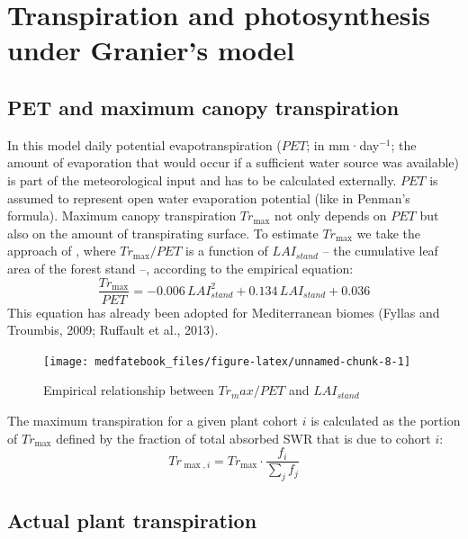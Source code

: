 \documentclass[]{book}
\begin{document}
\hypertarget{transpirationgranier}{%
\chapter{Transpiration and photosynthesis under Granier's model}\label{transpirationgranier}}

\hypertarget{pet-and-maximum-canopy-transpiration}{%
\section{PET and maximum canopy transpiration}\label{pet-and-maximum-canopy-transpiration}}

In this model daily potential evapotranspiration (\(PET\); in mm·day\(^{-1}\); the amount of evaporation that would occur if a sufficient water source was available) is part of the meteorological input and has to be calculated externally. \(PET\) is assumed to represent open water evaporation potential (like in Penman's formula). Maximum canopy transpiration \(Tr_{\max}\) not only depends on \(PET\) but also on the amount of transpirating surface. To estimate \(Tr_{\max}\) we take the approach of \citet{Granier1999}, where \(Tr_{\max}/PET\) is a function of \(LAI_{stand}\) -- the cumulative leaf area of the forest stand --, according to the empirical equation:
\begin{equation}
\frac{Tr_{\max}}{PET}= -0.006\,LAI_{stand}^2+0.134\,LAI_{stand}+0.036
\end{equation}
This equation has already been adopted for Mediterranean biomes (Fyllas and
Troumbis, 2009; Ruffault et al., 2013).

\begin{figure}

{\centering \texttt{[image: medfatebook\_files/figure-latex/unnamed-chunk-8-1]} 

}

\caption{Empirical relationship between $Tr_max/PET$ and $LAI_{stand}$}\label{fig:unnamed-chunk-8}
\end{figure}

The maximum transpiration for a given plant cohort \(i\) is calculated as the
portion of \(Tr_{\max}\) defined by the fraction of total absorbed SWR that is due
to cohort \(i\):
\begin{equation}
Tr_{\max, i} = Tr_{\max} \cdot \frac{f_i}{\sum_{j}{f_j}}
\end{equation}

\hypertarget{actual-plant-transpiration}{%
\section{Actual plant transpiration}\label{actual-plant-transpiration}}
\end{document}
